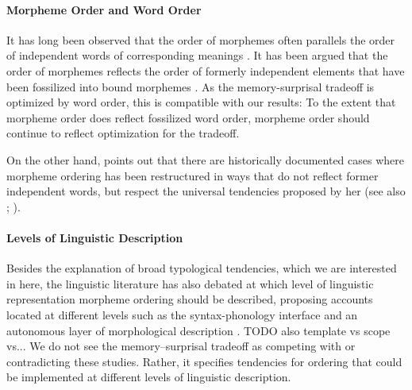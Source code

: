 \documentclass[11pt,letterpaper]{article}
\begin{document}
\paragraph{Morpheme Order and Word Order}
It has long been observed that the order of morphemes often parallels the order of independent words of corresponding meanings \citep{givon1971historical,venneman1973explanation,baker1985the}.
It has been argued that the order of morphemes reflects the order of formerly independent elements that have been fossilized into bound morphemes \citet{givon1971historical,venneman1973explanation}.
As the memory-surprisal tradeoff is optimized by word order, this is compatible with our results:
To the extent that morpheme order does reflect fossilized word order, morpheme order should continue to reflect optimization for the tradeoff.

On the other hand, \citet{bybee-morphology-1985} points out that there are historically documented cases where morpheme ordering has been restructured in ways that do not reflect former independent words, but respect the universal tendencies proposed by her (see also \citet{mithun2000the, haspelmath1993the, mithun1995affixation}; \citet[Section 15]{rice2000morpheme}).


\paragraph{Levels of Linguistic Description}
Besides the explanation of broad typological tendencies, which we are interested in here, the linguistic literature has also debated at which level of linguistic representation morpheme ordering should be described, proposing accounts located at different levels such as the syntax-phonology interface \citep{baker1985the} and an autonomous layer of morphological description \citep{hyman2003suffix}.
TODO also template vs scope vs...
We do not see the memory--surprisal tradeoff as competing with or contradicting these studies.
Rather, it specifies tendencies for ordering that could be implemented at different levels of linguistic description.




\end{document}
